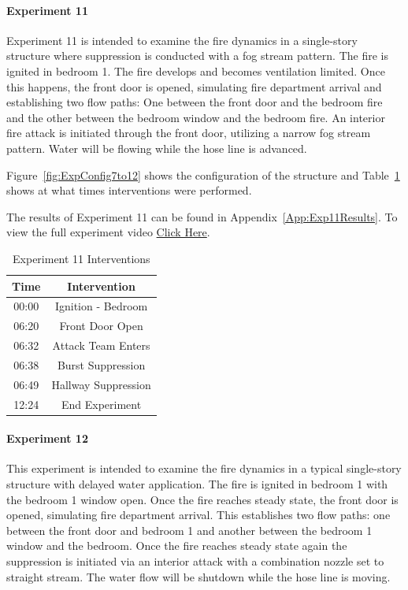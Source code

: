 \documentclass[12pt,oneside]{book}
\begin{document}
\clearpage

\paragraph{Experiment 11} \mbox{}

Experiment 11 is intended to examine the fire dynamics in a single-story structure where suppression is conducted with a fog stream pattern. The fire is ignited in bedroom 1. The fire develops and becomes ventilation limited. Once this happens, the front door is opened, simulating fire department arrival and establishing two flow paths: One between the front door and the bedroom fire and the other between the bedroom window and the bedroom fire. An interior fire attack is initiated through the front door, utilizing a narrow fog stream pattern. Water will be flowing while the hose line is advanced.  

Figure~\ref{fig:ExpConfig7to12} shows the configuration of the structure and Table~\ref{Table:Exp11Interventions} shows at what times interventions were performed. 

The results of Experiment 11 can be found in Appendix~\ref{App:Exp11Results}. To view the full experiment video \href{https://youtu.be/gl8rc1Nsl1k}{Click Here}.

\begin{table}[H]
	\centering
	\caption{Experiment 11 Interventions}
	\begin{tabular}{|c|c|} 
		\hline
		Time & Intervention \\ \hline \hline
		00:00 & Ignition - Bedroom \\ \hline
		06:20 & Front Door Open \\ \hline
		06:32 & Attack Team Enters\\ \hline
		06:38 & Burst Suppression \\ \hline 
		06:49 & Hallway Suppression \\ \hline
		12:24 & End Experiment\\ \hline
	\end{tabular}
	\label{Table:Exp11Interventions}
\end{table}

\clearpage

\paragraph{Experiment 12} \mbox{}

This experiment is intended to examine the fire dynamics in a typical single-story structure with delayed water application. The fire is ignited in bedroom 1 with the bedroom 1 window open. Once the fire reaches steady state, the front door is opened, simulating fire department arrival. This establishes two flow paths: one between the front door and bedroom 1 and another between the bedroom 1 window and the bedroom. Once the fire reaches steady state again the suppression is initiated via an interior attack with a combination nozzle set to straight stream. The water flow will be shutdown while the hose line is moving.  
\end{document}

